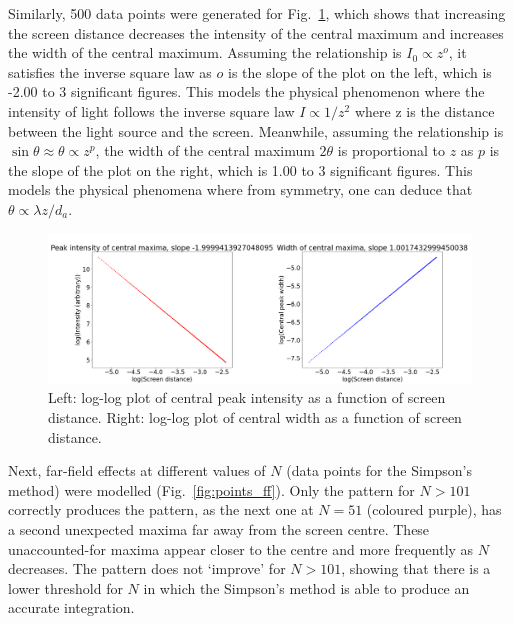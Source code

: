 \documentclass[hyphens,twocolumn,nobalancelastpage,aps,10pt,citeautoscript,longbibliography]{revtex4-2}
\begin{document}
Similarly, 500 data points were generated for
Fig.~\ref{fig:screen_distance_effects}, which shows that increasing the screen
distance decreases the intensity of the central maximum and increases the width
of the central maximum. Assuming the relationship is $I_0 \propto z^o$, it
satisfies the inverse square law as $o$ is the slope of the plot on the left,
which is -2.00 to 3 significant figures. This models the physical phenomenon
where the intensity of light follows the inverse square law $I \propto 1/z^2$
where z is the distance between the light source and the screen. Meanwhile,
assuming the relationship is $\sin{\theta} \approx {\theta} \propto z^p$, the
width of the central maximum $2\theta$ is proportional to $z$ as $p$ is the
slope of the plot on the right, which is 1.00 to 3 significant figures. This
models the physical phenomena where from symmetry, one can deduce that $\theta
	\propto \lambda z / d_a$.

\begin{figure}[htpb] \centering
	\includegraphics[width=1\linewidth]{./assets/diffraction_1d/screen_distance_effects_log.png}
	\caption{Left: log-log plot of central peak intensity as a function of screen distance. Right: log-log plot of central width as a function of screen distance.}%
	\label{fig:screen_distance_effects}
\end{figure}

Next, far-field effects at different values of $N$ (data points for the
Simpson's method) were modelled (Fig.~\ref{fig:points_ff}). Only the pattern for $N > 101$ correctly
produces the pattern, as the next one at $N = 51$ (coloured purple), has a
second unexpected maxima far away from the screen centre. These unaccounted-for
maxima appear closer to the centre and more frequently as $N$ decreases. The
pattern does not `improve' for $N > 101$, showing that there is a lower
threshold for $N$ in which the Simpson's method is able to produce an accurate
integration.
\end{document}

